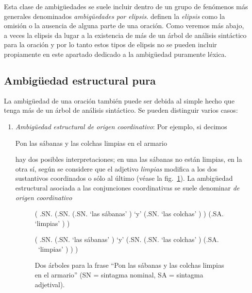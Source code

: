 \begin{enumerate}
Esta clase de ambigüedades se suele incluir dentro de un grupo de fenómenos más generales denominados \emph{ambigüedades por elipsis}. \citet{alcaraz97b} definen la \emph{elipsis}\label{pg:ellipsi} como la omisión o la ausencia de alguna parte de una oración. Como veremos más abajo, a veces la elipsis da lugar a la existencia de más de un árbol de análisis sintáctico para la oración y por lo tanto estos tipos de elipsis no se pueden incluir propiamente en este apartado dedicado a la ambigüedad puramente léxica. \end{enumerate} 

\subsection{Ambigüedad estructural pura} \label{ss:ambest} La ambigüedad de una oración también puede ser debida al simple hecho que tenga más de un árbol de análisis sintáctico. Se pueden distinguir varios casos: \begin{enumerate} \item \emph{Ambigüedad estructural de origen coordinativo}: Por ejemplo, si decimos \begin{exemple} Pon las sábanas y las colchas limpias en el armario \end{exemple} hay dos posibles interpretaciones; en una las sábanas no están limpias, en la otra sí, según se considere que el adjetivo \emph{limpias} modifica a los dos sustantivos coordinados o sólo al último (véase la fig.~\ref{fg:cobertors}). La ambigüedad estructural asociada a las conjunciones coordinativas se suele denominar \emph{de origen coordinativo} 

\begin{figure} \begin{center} \begin{parsetree} ( .SN. (.SN. (.SN.  `las sábanas' ) `y' (.SN.  `las colchas' ) ) (.SA.  `limpias' ) ) \end{parsetree} \end{center} \begin{center} \begin{parsetree} ( .SN. (.SN.  `las sábanas' ) `y' (.SN. (.SN.  `las colchas' ) (.SA. ~`limpias' ) ) ) \end{parsetree} \end{center} \caption{Dos árboles para la frase ``Pon las sábanas y las colchas limpias en el armario'' (SN = sintagma nominal, SA = sintagma adjetival).} \label{fg:cobertors} \end{figure} 


\end{enumerate}
